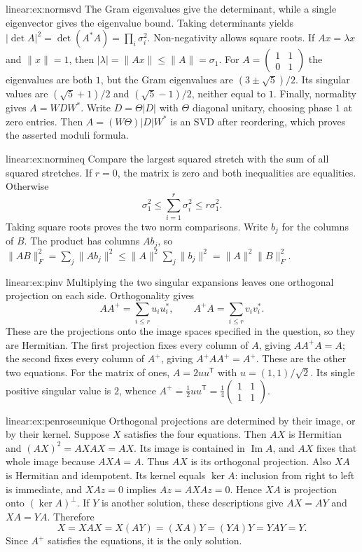 \begin{solution}{linear:ex:normsvd}
\idea The Gram eigenvalues give the determinant, while a single eigenvector gives the eigenvalue bound.
\writeup Taking determinants yields $|\det A|^2=\det(A^*A)=\prod_i\sigma_i^2$. Non-negativity allows square roots. If $Ax=\lambda x$ and $\|x\|=1$, then $|\lambda|=\|Ax\|\le\|A\|=\sigma_1$.
For $A=\begin{pmatrix}1&1\\0&1\end{pmatrix}$ the eigenvalues are both $1$, but the Gram eigenvalues are $(3\pm\sqrt5)/2$. Its singular values are $(\sqrt5+1)/2$ and $(\sqrt5-1)/2$, neither equal to $1$.
Finally, normality gives $A=WDW^*$. Write $D=\Theta|D|$ with $\Theta$ diagonal unitary, choosing phase $1$ at zero entries. Then $A=(W\Theta)|D|W^*$ is an SVD after reordering, which proves the asserted moduli formula.
\end{solution}

\begin{solution}{linear:ex:normineq}
\idea Compare the largest squared stretch with the sum of all squared stretches.
\writeup If $r=0$, the matrix is zero and both inequalities are equalities. Otherwise
\[
\sigma_1^2\le\sum_{i=1}^r\sigma_i^2\le r\sigma_1^2.
\]
Taking square roots proves the two norm comparisons. Write $b_j$ for the columns of $B$. The product has columns $Ab_j$, so
$\|AB\|_F^2=\sum_j\|Ab_j\|^2\le\|A\|^2\sum_j\|b_j\|^2=\|A\|^2\|B\|_F^2$.
\end{solution}

\begin{solution}{linear:ex:pinv}
\idea Multiplying the two singular expansions leaves one orthogonal projection on each side.
\writeup Orthogonality gives
\[
AA^+=\sum_{i\le r}u_iu_i^*,\qquad A^+A=\sum_{i\le r}v_iv_i^*.
\]
These are the projections onto the image spaces specified in the question, so they are Hermitian. The first projection fixes every column of $A$, giving $AA^+A=A$; the second fixes every column of $A^+$, giving $A^+AA^+=A^+$. These are the other two equations.
For the matrix of ones, $A=2uu^{\mathsf T}$ with $u=(1,1)/\sqrt2$. Its single positive singular value is $2$, whence $A^+=\tfrac12uu^{\mathsf T}=\tfrac14\begin{pmatrix}1&1\\1&1\end{pmatrix}$.
\end{solution}

\begin{solution}{linear:ex:penroseunique}
\idea Orthogonal projections are determined by their image, or by their kernel.
\writeup Suppose $X$ satisfies the four equations. Then $AX$ is Hermitian and $(AX)^2=AXAX=AX$. Its image is contained in $\operatorname{Im}A$, and $AX$ fixes that whole image because $AXA=A$. Thus $AX$ is its orthogonal projection. Also $XA$ is Hermitian and idempotent. Its kernel equals $\ker A$: inclusion from right to left is immediate, and $XAz=0$ implies $Az=AXAz=0$. Hence $XA$ is projection onto $(\ker A)^\perp$.
If $Y$ is another solution, these descriptions give $AX=AY$ and $XA=YA$. Therefore
\[
X=XAX=X(AY)=(XA)Y=(YA)Y=YAY=Y.
\]
Since $A^+$ satisfies the equations, it is the only solution.
\end{solution}

